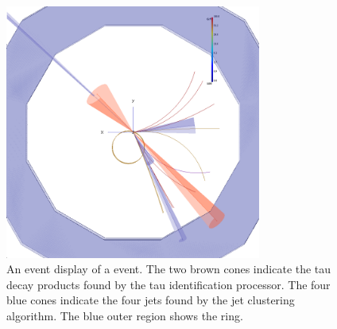 \begin{figure}[htbp]
\centering %
  \includegraphics[width=0.75\textwidth]{tau/NoTimeAnalysis/EvtDsp}
  \caption{An event display of a \eeZZQQ event. The two brown cones indicate the tau decay products found by the tau identification processor. The four blue cones indicate the four jets found by the jet clustering algorithm. The blue outer region shows the \HCAL ring.}
  \label{fig:TauNTAevtDsp}
\end{figure}










